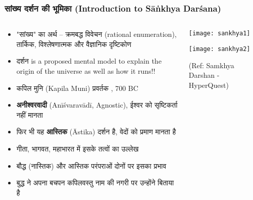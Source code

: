\begin{frame}[fragile]\frametitle{सांख्य दर्शन की भूमिका (Introduction to Sāṅkhya Darśana)}
\begin{columns}
    \begin{column}[T]{0.6\linewidth}
      \begin{itemize}
        \item "सांख्य" का अर्थ – क्रमबद्ध विवेचन (rational enumeration), तार्किक, विश्लेषणात्मक और वैज्ञानिक दृष्टिकोण
        \item दर्शन is a proposed mental model to explain the origin of the universe as well as how it runs!!		
        \item कपिल मुनि (Kapila Muni)   प्रवर्तक , 700 BC
        \item \textbf{अनीश्वरवादी} (Anīśvaravādī, Agnostic), ईश्वर को सृष्टिकर्ता नहीं मानता
        \item फिर भी यह \textbf{आस्तिक} (Āstika) दर्शन है,  वेदों को प्रमाण मानता है
        \item गीता, भागवत, महाभारत में इसके तत्वों का उल्लेख
        \item बौद्ध (नास्तिक) और आस्तिक परंपराओं दोनों पर इसका प्रभाव
		\item बुद्ध ने अपना बचपन कपिलवस्तु नाम की नगरी पर उन्होंने बिताया है 

      \end{itemize}
    \end{column}
    \begin{column}[T]{0.4\linewidth}
      \begin{center}
        \texttt{[image: sankhya1]}
		
        \texttt{[image: sankhya2]}
		
		{\tiny (Ref: Samkhya Darshan - HyperQuest)}
		
      \end{center}	
    \end{column}
\end{columns}
\end{frame}

